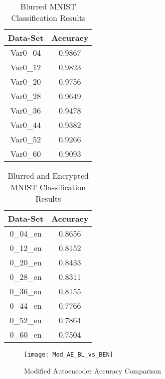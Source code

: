 \documentclass[12pt, titlepage]{article}
\begin{document}
\begin{table}[!h]
	\begin{center}
		\begin{tabular}{| c | c |}
			\hline
			\textbf{Data-Set} & \textbf{Accuracy}\\
			\hline
			Var0\_04 & 0.9867\\
			\hline
			Var0\_12 & 0.9823\\
			\hline
			Var0\_20 & 0.9756\\
			\hline
			Var0\_28 & 0.9649\\
			\hline
			Var0\_36 & 0.9478\\
			\hline
			Var0\_44 & 0.9382\\
			\hline
			Var0\_52 & 0.9266\\
			\hline
			Var0\_60 & 0.9093\\
			\hline
		\end{tabular}
		\caption{Blurred MNIST Classification Results}
		\label{table:modAE_Blurred}
	\end{center}
\end{table}

\begin{table}[!h]
	\begin{center}
		\begin{tabular}{| c | c |}
			\hline
			\textbf{Data-Set} & \textbf{Accuracy}\\
			\hline
			0\_04\_en & 0.8656\\
			\hline
			0\_12\_en & 0.8152\\
			\hline
			0\_20\_en & 0.8433\\
			\hline
			0\_28\_en & 0.8311\\
			\hline
			0\_36\_en & 0.8155\\
			\hline
			0\_44\_en & 0.7766\\
			\hline
			0\_52\_en & 0.7864\\
			\hline
			0\_60\_en & 0.7504\\
			\hline
		\end{tabular}
		\caption{Blurred and Encrypted MNIST Classification Results}
		\label{table:modAE_BlurredEncrypted}
	\end{center}
\end{table}

\begin{figure}[h!]
	\begin{center}
		\texttt{[image: Mod\_AE\_BL\_vs\_BEN]}
		\caption{Modified Autoencoder Accuracy Comparison}
		\label{GRAPH_ModifiedAE}
	\end{center}
\end{figure} 
\end{document}
